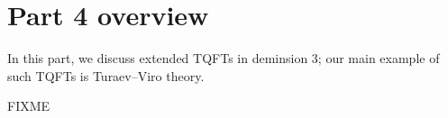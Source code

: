 \chapter*{Part 4 overview}\label{c:p4-overview}
In this part, we discuss extended TQFTs in deminsion 3;
our main example of such TQFTs is Turaev--Viro theory.

FIXME
